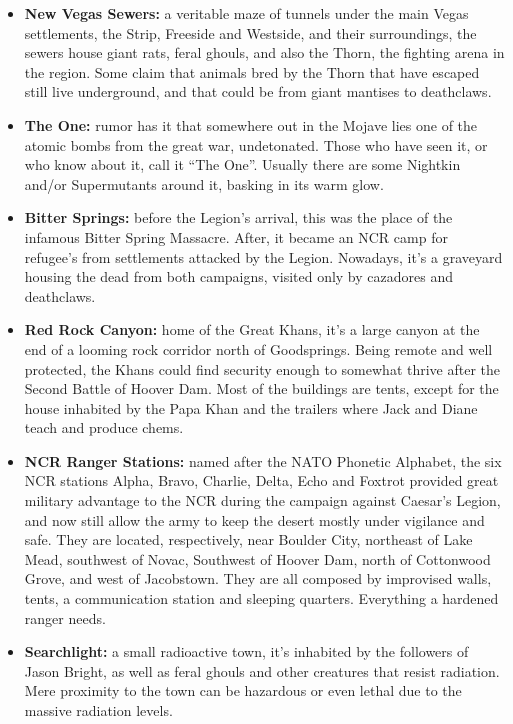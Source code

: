 \documentclass[11pt]{article} %
\begin{document}
\begin{itemize}
\item \textbf{New Vegas Sewers:} a veritable maze of tunnels under the main Vegas settlements, the Strip, Freeside and Westside, and their surroundings, the sewers house giant rats, feral ghouls, and also the Thorn, the fighting arena in the region. Some claim that animals bred by the Thorn that have escaped still live underground, and that could be from giant mantises to deathclaws.

\item \textbf{The One:} rumor has it that somewhere out in the Mojave lies one of the atomic bombs from the great war, undetonated. Those who have seen it, or who know about it, call it ``The One''. Usually there are some Nightkin and/or Supermutants around it, basking in its warm glow.

\item \textbf{Bitter Springs:} before the Legion's arrival, this was the place of the infamous Bitter Spring Massacre. After, it became an NCR camp for refugee's from settlements attacked by the Legion. Nowadays, it's a graveyard housing the dead from both campaigns, visited only by cazadores and deathclaws.

\item \textbf{Red Rock Canyon:} home of the Great Khans, it's a large canyon at the end of a looming rock corridor north of Goodsprings. Being remote and well protected, the Khans could find security enough to somewhat thrive after the Second Battle of Hoover Dam. Most of the buildings are tents, except for the house inhabited by the Papa Khan and the trailers where Jack and Diane teach and produce chems.

\item \textbf{NCR Ranger Stations:} named after the NATO Phonetic Alphabet, the six NCR stations Alpha, Bravo, Charlie, Delta, Echo and Foxtrot provided great military advantage to the NCR during the campaign against Caesar's Legion, and now still allow the army to keep the desert mostly under vigilance and safe. They are located, respectively, near Boulder City, northeast of Lake Mead, southwest of Novac, Southwest of Hoover Dam, north of Cottonwood Grove, and west of Jacobstown. They are all composed by improvised walls, tents, a communication station and sleeping quarters. Everything a hardened ranger needs.

\item \textbf{Searchlight:} a small radioactive town, it's inhabited by the followers of Jason Bright, as well as feral ghouls and other creatures that resist radiation. Mere proximity to the town can be hazardous or even lethal due to the massive radiation levels.
\end{itemize}
\end{document}

